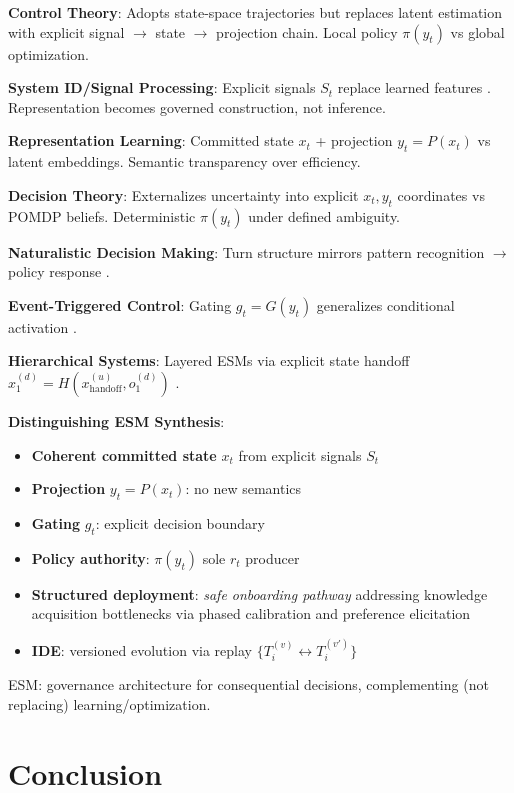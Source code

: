 \documentclass[11pt]{article}
\begin{document}
\textbf{Control Theory}: Adopts state-space trajectories \cite{astrom2010} but replaces latent estimation with explicit signal $\to$ state $\to$ projection chain. Local policy $\pi(y_t)$ vs global optimization.

\textbf{System ID/Signal Processing}: Explicit signals $S_t$ replace learned features \cite{ljung1999}. Representation becomes governed construction, not inference.

\textbf{Representation Learning}: Committed state $x_t$ + projection $y_t = P(x_t)$ vs latent embeddings. Semantic transparency over efficiency.

\textbf{Decision Theory}: Externalizes uncertainty into explicit $x_t,y_t$ coordinates vs POMDP beliefs. Deterministic $\pi(y_t)$ under defined ambiguity.

\textbf{Naturalistic Decision Making}: Turn structure mirrors pattern recognition $\to$ policy response \cite{klein1998}.

\textbf{Event-Triggered Control}: Gating $g_t = G(y_t)$ generalizes conditional activation \cite{tabuada2007}.

\textbf{Hierarchical Systems}: Layered ESMs via explicit state handoff $x_1^{(d)} = H(x_{\text{handoff}}^{(u)}, o_1^{(d)})$ \cite{simon1962}.

\textbf{Distinguishing ESM Synthesis}:
\begin{itemize}
    \item \textbf{Coherent committed state} $x_t$ from explicit signals $S_t$
    \item \textbf{Projection} $y_t = P(x_t)$: no new semantics
    \item \textbf{Gating} $g_t$: explicit decision boundary  
    \item \textbf{Policy authority}: $\pi(y_t)$ sole $r_t$ producer
    \item \textbf{Structured deployment}: \emph{safe onboarding pathway} addressing knowledge acquisition bottlenecks via phased calibration and preference elicitation \cite{hoffman1987}
    \item \textbf{IDE}: versioned evolution via replay $\{T_i^{(v)} \leftrightarrow T_i^{(v')}\}$
\end{itemize}

ESM: governance architecture for consequential decisions, complementing (not replacing) learning/optimization.

\section{Conclusion}
\end{document}
